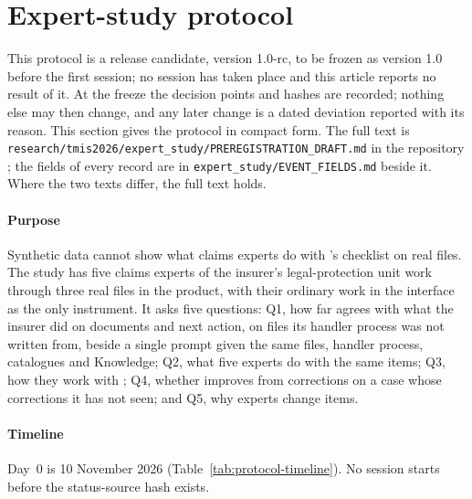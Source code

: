 \section{Expert-study protocol}
\label{app:protocol-compact}

This protocol is a release candidate, version 1.0-rc, to be frozen as version 1.0 before the first session; no session has taken place and this article reports no result of it. At the freeze the decision points and hashes are recorded; nothing else may then change, and any later change is a dated deviation reported with its reason. This section gives the protocol in compact form. The full text is \texttt{research/\allowbreak{}tmis2026/\allowbreak{}expert\_study/\allowbreak{}PREREGISTRATION\_DRAFT.md} in the repository \cite{casepath2026repo}; the fields of every record are in \texttt{expert\_study/\allowbreak{}EVENT\_FIELDS.md} beside it. Where the two texts differ, the full text holds.

\paragraph{Purpose}
Synthetic data cannot show what claims experts do with \casepath's checklist on real files. The study has five claims experts of the insurer's legal-protection unit work through three real files in the product, with their ordinary work in the interface as the only instrument. It asks five questions: Q1, how far \casepath agrees with what the insurer did on documents and next action, on files its handler process was not written from, beside a single prompt given the same files, handler process, catalogues and Knowledge; Q2, what five experts do with the same items; Q3, how they work with \casepath; Q4, whether \casepath improves from corrections on a case whose corrections it has not seen; and Q5, why experts change items.

\paragraph{Timeline}
Day~0 is 10 November 2026 (Table~\ref{tab:protocol-timeline}). No session starts before the status-source hash exists.

